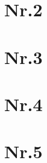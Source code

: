 \documentclass[a4paper,11pt,twoside]{article}
\begin{document}
\section*{Nr.2}


\section*{Nr.3}


\section*{Nr.4}


\section*{Nr.5}
\end{document}
